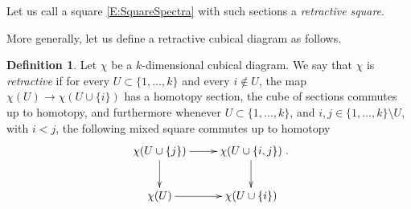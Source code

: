 \documentclass[12pt]{amsart}
\theoremstyle{plain}
\theoremstyle{definition}
\newtheorem{defin}[thm]{Definition}
\theoremstyle{remark}
\begin{document}
Let us call a square \eqref{E:SquareSpectra} with such sections a \textit{retractive square}.

More generally, let us define a retractive cubical diagram as follows. 
\begin{defin}
Let $\chi$ be a $k$-dimensional cubical diagram. We say that $\chi$ is \textit{retractive} if for every $U\subset \{1, \ldots, k\}$ and every $i\notin U$, the map $\chi(U)\to \chi(U\cup \{i\})$ has a homotopy section, the cube of sections commutes up to homotopy, and furthermore whenever $U\subset \{1, \ldots, k\}$, and $i, j\in \{1, \ldots, k\}\setminus U$, with $i<j$, the following mixed square commutes up to homotopy
 $$
\xymatrix{
\chi(U\cup \{j\}) \ar[r]\ar[d] & \chi(U\cup \{i, j\}) \ar[d] \\
\chi(U) \ar[r] & \chi(U\cup\{i\})
}.
$$
\end{defin}
\end{document}
